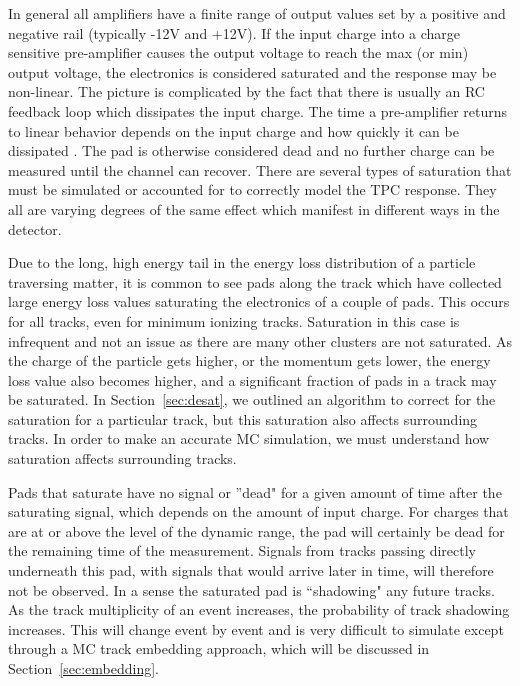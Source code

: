 In general all amplifiers have a finite range of output values set by a positive and negative rail (typically -12V and +12V). If the input charge into a charge sensitive pre-amplifier causes the output voltage to reach the max (or min) output voltage, the electronics is considered saturated and the response may be non-linear. The picture is complicated by the fact that there is usually an RC feedback loop which dissipates the input charge. The time a pre-amplifier returns to linear behavior depends on the input charge and how quickly it can be dissipated \cite{akiGET}. The pad is otherwise considered dead and no further charge can be measured until the channel can recover. There are several types of saturation that must be simulated or accounted for to correctly model the TPC response. They all are varying degrees of the same effect which manifest in different ways in the detector. 
 
Due to the long, high energy tail in  the energy loss distribution of a particle traversing matter, it is common to see pads along the track which have collected large energy loss values saturating the electronics of a couple of pads. This occurs for all tracks, even for minimum ionizing tracks. Saturation in this case is infrequent and not an issue as there are many other clusters are not saturated. As the charge of the particle gets higher, or the momentum gets lower, the  energy loss value also becomes higher, and a significant fraction of pads in a track may be saturated. In Section~\ref{sec:desat}, we outlined an algorithm to correct for the saturation for a  particular track, but this saturation also affects surrounding tracks. In order to make an accurate MC simulation, we must understand how saturation affects surrounding tracks. 

Pads that saturate have no signal or ''dead" for a given amount of time  after the saturating signal, which depends on the amount of input charge. For charges that are at or above the level of the dynamic range, the pad will certainly be dead for the remaining time of the measurement.  Signals from tracks passing directly underneath this pad, with signals that would arrive later in time,  will therefore not be observed. In a sense the saturated pad is ``shadowing" any future tracks. As the track multiplicity of an event increases, the probability of track shadowing increases. This will change event by event and is very difficult to simulate except through a MC track embedding approach, which will be discussed in Section~\ref{sec:embedding}. 


